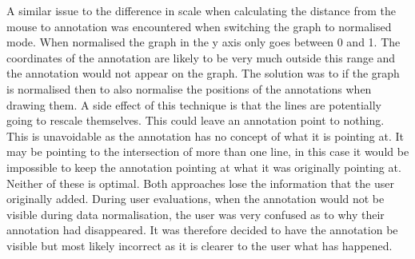 A similar issue to the difference in scale when calculating the distance from the mouse to annotation was encountered when switching the graph to normalised mode.  When normalised the graph in the y axis only goes between 0 and 1.  The coordinates of the annotation are likely to be very much outside this range and the annotation would not appear on the graph.  The solution was to if the graph is normalised then to also normalise the positions of the annotations when drawing them.  A side effect of this technique is that the lines are potentially going to rescale themselves.  This could leave an annotation point to nothing.  This is unavoidable as the annotation has no concept of what it is pointing at.  It may be pointing to the intersection of more than one line, in this case it would be impossible to keep the annotation pointing at what it was originally pointing at.  Neither of these is optimal.  Both approaches lose the information that the user originally added.  During user evaluations, when the annotation would not be visible during data normalisation, the user was very confused as to why their annotation had disappeared.  It was therefore decided to have the annotation be visible but most likely incorrect as it is clearer to the user what has happened.


